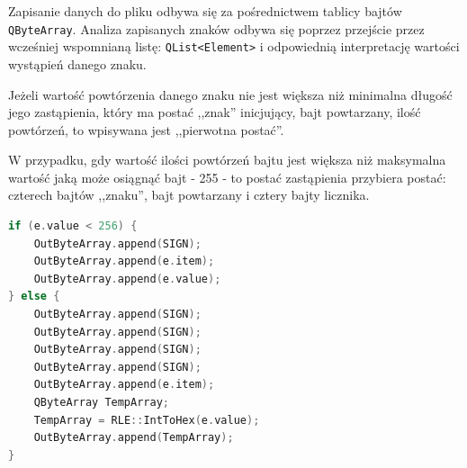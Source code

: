 \documentclass[12pt,a4paper,notitlepage]{report}
\begin{document}
Zapisanie danych do pliku odbywa się za pośrednictwem tablicy bajtów \lstinline;QByteArray;. Analiza zapisanych znaków odbywa się poprzez przejście przez wcześniej wspomnianą listę: \lstinline;QList<Element>; i odpowiednią interpretację  wartości wystąpień danego znaku. 

Jeżeli wartość powtórzenia danego znaku nie jest większa niż minimalna długość jego zastąpienia, który ma postać ,,znak'' inicjujący, bajt powtarzany, ilość powtórzeń, to wpisywana jest ,,pierwotna postać''.

W przypadku, gdy wartość ilości powtórzeń bajtu jest większa niż maksymalna wartość jaką może osiągnąć bajt - 255 - to postać zastąpienia przybiera postać: czterech bajtów ,,znaku'', bajt powtarzany i cztery bajty licznika.
\begin{lstlisting}[language=C++, caption={Zapisanie i zakodowania danych skompresowanych do pliku}]
if (e.value < 256) {
	OutByteArray.append(SIGN);
	OutByteArray.append(e.item);
	OutByteArray.append(e.value);
} else {
	OutByteArray.append(SIGN);
    OutByteArray.append(SIGN);
    OutByteArray.append(SIGN);
    OutByteArray.append(SIGN);
    OutByteArray.append(e.item);
    QByteArray TempArray;
    TempArray = RLE::IntToHex(e.value);
    OutByteArray.append(TempArray);
}
\end{lstlisting}
\end{document}
